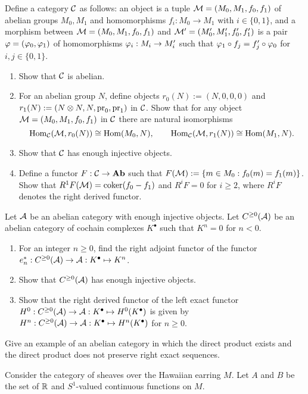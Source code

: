 \documentclass{../../../small}
\begin{document}
\begin{prb}
Define a category $\mathcal{C}$ as follows: an object is a tuple $\mathcal{M}=(M_0,M_1,f_0,f_1)$ of abelian groups $M_0,M_1$ and homomorphisms $f_i:M_0\to M_1$ with $i\in\{0,1\}$, and a morphism between $\mathcal{M}=(M_0,M_1,f_0,f_1)$ and $\mathcal{M}'=(M_0',M_1',f_0',f_1')$ is a pair $\varphi=(\varphi_0,\varphi_1)$ of homomorphisms $\varphi_i:M_i\to M_i'$ such that $\varphi_1\circ f_j=f_j'\circ\varphi_0$ for $i,j\in\{0,1\}$.
\begin{enumerate}[(1)]
\item Show that $\mathcal{C}$ is abelian.
\item For an abelian group $N$, define objects $r_0(N):=(N,0,0,0)$ and $r_1(N):=(N\otimes N,N,\operatorname{pr}_0,\operatorname{pr}_1)$ in $\mathcal{C}$. Show that for any object $\mathcal{M}=(M_0,M_1,f_0,f_1)$ in $\mathcal{C}$ there are natural isomorphisms
\[\operatorname{Hom}_{\mathcal{C}}(\mathcal{M},r_0(N))\cong\operatorname{Hom}(M_0,N),\qquad\operatorname{Hom}_{\mathcal{C}}(\mathcal{M},r_1(N))\cong\operatorname{Hom}(M_1,N).\]
\item Show that $\mathcal{C}$ has enough injective objects.
\item Define a functor $F:\mathcal{C}\to\mathbf{Ab}$ such that $F(\mathcal{M}):=\{m\in M_0:f_0(m)=f_1(m)\}$. Show that $R^1F(\mathcal{M})=\operatorname{coker}(f_0-f_1)$ and $R^iF=0$ for $i\ge2$, where $R^iF$ denotes the right derived functor.
\end{enumerate}
\end{prb}
\begin{sol}
\end{sol}

\begin{prb}
Let $\mathcal{A}$ be an abelian category with enough injective objects.
Let $C^{\ge0}(\mathcal{A})$ be an abelian category of cochain complexes $K^\bullet$ such that $K^n=0$ for $n<0$.
\begin{enumerate}[(1)]
\item For an integer $n\ge0$, find the right adjoint functor of the functor $e_n^*:C^{\ge0}(\mathcal{A})\to\mathcal{A}:K^\bullet\mapsto K^n$.
\item Show that $C^{\ge0}(\mathcal{A})$ has enough injective objects.
\item Show that the right derived functor of the left exact functor $H^0:C^{\ge0}(\mathcal{A})\to\mathcal{A}:K^\bullet\mapsto H^0(K^\bullet)$ is given by $H^n:C^{\ge0}(\mathcal{A})\to\mathcal{A}:K^\bullet\mapsto H^n(K^\bullet)$ for $n\ge0$.
\end{enumerate}
\end{prb}
\begin{sol}

\end{sol}

\begin{prb}
Give an example of an abelian category in which the direct product exists and the direct product does not preserve right exact sequences.
\end{prb}
\begin{sol}
Consider the category of sheaves over the Hawaiian earring $M$.
Let $A$ and $B$ be the set of $\mathbb{R}$ and $S^1$-valued continuous functions on $M$.
\end{sol}
\end{document}
